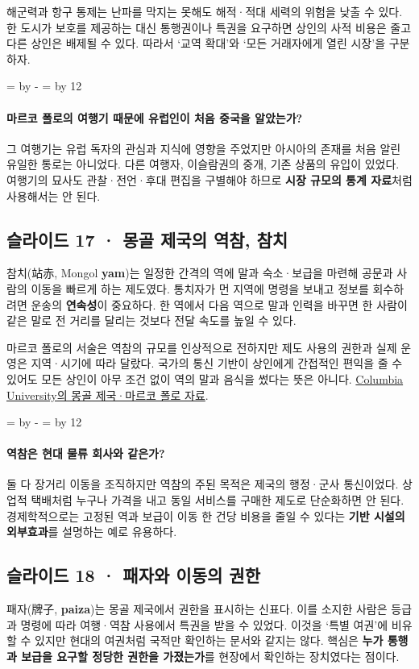 \documentclass[10pt,a4paper]{article}
\newcommand{\ReserveQuestionSpace}{%
  \par\begingroup
  \dimen0=\pagegoal \advance\dimen0 by -\pagetotal
  \dimen2=\baselineskip \multiply\dimen2 by 12
  \ifdim\dimen0<\dimen2 \newpage\fi
  \endgroup}
\begin{document}
해군력과 항구 통제는 난파를 막지는 못해도 해적·적대 세력의 위험을 낮출 수 있다. 한 도시가 보호를 제공하는 대신 통행권이나 특권을 요구하면 상인의 사적 비용은 줄고 다른 상인은 배제될 수 있다. 따라서 ‘교역 확대’와 ‘모든 거래자에게 열린 시장’을 구분하자.\par

\ReserveQuestionSpace
\paragraph{마르코 폴로의 여행기 때문에 유럽인이 처음 중국을 알았는가?}
그 여행기는 유럽 독자의 관심과 지식에 영향을 주었지만 아시아의 존재를 처음 알린 유일한 통로는 아니었다. 다른 여행자, 이슬람권의 중개, 기존 상품의 유입이 있었다. 여행기의 묘사도 관찰·전언·후대 편집을 구별해야 하므로 \textbf{시장 규모의 통계 자료}처럼 사용해서는 안 된다.\par

\subsection{슬라이드 17 · 몽골 제국의 역참, 참치}
참치(站赤, Mongol \textbf{yam})는 일정한 간격의 역에 말과 숙소·보급을 마련해 공문과 사람의 이동을 빠르게 하는 제도였다. 통치자가 먼 지역에 명령을 보내고 정보를 회수하려면 운송의 \textbf{연속성}이 중요하다. 한 역에서 다음 역으로 말과 인력을 바꾸면 한 사람이 같은 말로 전 거리를 달리는 것보다 전달 속도를 높일 수 있다.\par

마르코 폴로의 서술은 역참의 규모를 인상적으로 전하지만 제도 사용의 권한과 실제 운영은 지역·시기에 따라 달랐다. 국가의 통신 기반이 상인에게 간접적인 편익을 줄 수 있어도 모든 상인이 아무 조건 없이 역의 말과 음식을 썼다는 뜻은 아니다. \href{https://afe.easia.columbia.edu/mongols/pop/menu/class\_marco.htm}{Columbia University의 몽골 제국·마르코 폴로 자료}.\par

\ReserveQuestionSpace
\paragraph{역참은 현대 물류 회사와 같은가?}
둘 다 장거리 이동을 조직하지만 역참의 주된 목적은 제국의 행정·군사 통신이었다. 상업적 택배처럼 누구나 가격을 내고 동일 서비스를 구매한 제도로 단순화하면 안 된다. 경제학적으로는 고정된 역과 보급이 이동 한 건당 비용을 줄일 수 있다는 \textbf{기반 시설의 외부효과}를 설명하는 예로 유용하다.\par

\subsection{슬라이드 18 · 패자와 이동의 권한}
패자(牌子, \textbf{paiza})는 몽골 제국에서 권한을 표시하는 신표다. 이를 소지한 사람은 등급과 명령에 따라 여행·역참 사용에서 특권을 받을 수 있었다. 이것을 ‘특별 여권’에 비유할 수 있지만 현대의 여권처럼 국적만 확인하는 문서와 같지는 않다. 핵심은 \textbf{누가 통행과 보급을 요구할 정당한 권한을 가졌는가}를 현장에서 확인하는 장치였다는 점이다.\par
\end{document}
